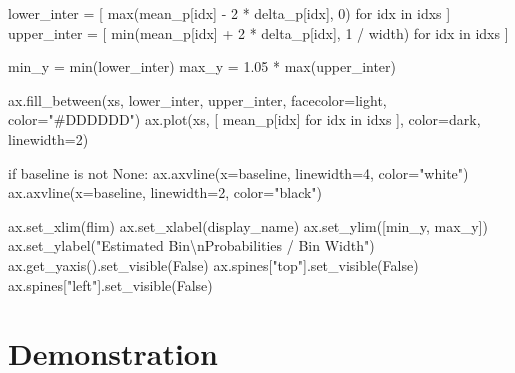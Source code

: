 \documentclass[
  letterpaper,
  DIV=11,
  numbers=noendperiod]{scrartcl}
\newenvironment{Shaded}{\begin{snugshade}}{\end{snugshade}}
\newcommand{\BuiltInTok}[1]{\textcolor[rgb]{0.00,0.23,0.31}{#1}}
\newcommand{\CharTok}[1]{\textcolor[rgb]{0.13,0.47,0.30}{#1}}
\newcommand{\ControlFlowTok}[1]{\textcolor[rgb]{0.00,0.23,0.31}{#1}}
\newcommand{\DecValTok}[1]{\textcolor[rgb]{0.68,0.00,0.00}{#1}}
\newcommand{\FloatTok}[1]{\textcolor[rgb]{0.68,0.00,0.00}{#1}}
\newcommand{\KeywordTok}[1]{\textcolor[rgb]{0.00,0.23,0.31}{#1}}
\newcommand{\NormalTok}[1]{\textcolor[rgb]{0.00,0.23,0.31}{#1}}
\newcommand{\OperatorTok}[1]{\textcolor[rgb]{0.37,0.37,0.37}{#1}}
\newcommand{\StringTok}[1]{\textcolor[rgb]{0.13,0.47,0.30}{#1}}
\newcommand{\VariableTok}[1]{\textcolor[rgb]{0.07,0.07,0.07}{#1}}
\begin{document}
\begin{Shaded}
\begin{Highlighting}[]
\NormalTok{  lower\_inter }\OperatorTok{=}\NormalTok{ [ }\BuiltInTok{max}\NormalTok{(mean\_p[idx] }\OperatorTok{{-}} \DecValTok{2} \OperatorTok{*}\NormalTok{ delta\_p[idx], }\DecValTok{0}\NormalTok{)}
                  \ControlFlowTok{for}\NormalTok{ idx }\KeywordTok{in}\NormalTok{ idxs ]}
\NormalTok{  upper\_inter }\OperatorTok{=}\NormalTok{ [ }\BuiltInTok{min}\NormalTok{(mean\_p[idx] }\OperatorTok{+} \DecValTok{2} \OperatorTok{*}\NormalTok{ delta\_p[idx], }\DecValTok{1} \OperatorTok{/}\NormalTok{ width) }
                  \ControlFlowTok{for}\NormalTok{ idx }\KeywordTok{in}\NormalTok{ idxs ]}
  
\NormalTok{  min\_y }\OperatorTok{=}        \BuiltInTok{min}\NormalTok{(lower\_inter)}
\NormalTok{  max\_y }\OperatorTok{=} \FloatTok{1.05} \OperatorTok{*} \BuiltInTok{max}\NormalTok{(upper\_inter)}
  
\NormalTok{  ax.fill\_between(xs, lower\_inter, upper\_inter,}
\NormalTok{                  facecolor}\OperatorTok{=}\NormalTok{light, color}\OperatorTok{=}\StringTok{"\#DDDDDD"}\NormalTok{)}
\NormalTok{  ax.plot(xs, [ mean\_p[idx] }\ControlFlowTok{for}\NormalTok{ idx }\KeywordTok{in}\NormalTok{ idxs ], color}\OperatorTok{=}\NormalTok{dark, linewidth}\OperatorTok{=}\DecValTok{2}\NormalTok{)}
  
  \ControlFlowTok{if}\NormalTok{ baseline }\KeywordTok{is} \KeywordTok{not} \VariableTok{None}\NormalTok{:}
\NormalTok{    ax.axvline(x}\OperatorTok{=}\NormalTok{baseline, linewidth}\OperatorTok{=}\DecValTok{4}\NormalTok{, color}\OperatorTok{=}\StringTok{"white"}\NormalTok{)}
\NormalTok{    ax.axvline(x}\OperatorTok{=}\NormalTok{baseline, linewidth}\OperatorTok{=}\DecValTok{2}\NormalTok{, color}\OperatorTok{=}\StringTok{"black"}\NormalTok{)}
  
\NormalTok{  ax.set\_xlim(flim)}
\NormalTok{  ax.set\_xlabel(display\_name)}
\NormalTok{  ax.set\_ylim([min\_y, max\_y])}
\NormalTok{  ax.set\_ylabel(}\StringTok{"Estimated Bin}\CharTok{\textbackslash{}n}\StringTok{Probabilities / Bin Width"}\NormalTok{)}
\NormalTok{  ax.get\_yaxis().set\_visible(}\VariableTok{False}\NormalTok{)}
\NormalTok{  ax.spines[}\StringTok{"top"}\NormalTok{].set\_visible(}\VariableTok{False}\NormalTok{)}
\NormalTok{  ax.spines[}\StringTok{"left"}\NormalTok{].set\_visible(}\VariableTok{False}\NormalTok{)}
\end{Highlighting}
\end{Shaded}

\hypertarget{demonstration}{%
\section{Demonstration}\label{demonstration}}
\end{document}
